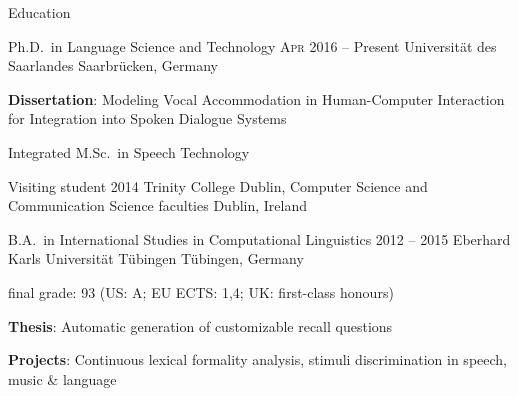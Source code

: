 \documentclass{resume} %
\begin{document}
\begin{rSection}{Education}

\begin{rSubsection}
	{Ph.D.\ in Language Science and Technology}
	{\textsc{Apr} 2016 -- Present}
	{Universität des Saarlandes}
	{Saarbrücken, Germany} %
	
	\setlength{\itemindent}{.7cm}
		
	\item \textbf{Dissertation}: Modeling Vocal Accommodation in Human-Computer Interaction for Integration \hspace*{3.4cm}into Spoken Dialogue Systems %
	\item Integrated M.Sc.\ in Speech Technology
\end{rSubsection}

\begin{rSubsection}
	{Visiting student}
	{2014}
	{Trinity College Dublin, Computer Science and Communication Science faculties}
	{Dublin, Ireland}
	
	\setlength{\itemindent}{.7cm}
	
	\item[]
\end{rSubsection}

\begin{rSubsection}
	{B.A.\ in International Studies in Computational Linguistics}
	{2012 -- 2015}
	{Eberhard Karls Universität Tübingen}
	{Tübingen, Germany}
	
	\vspace*{-.2cm}
	\item[]{final grade: 93 {\footnotesize (US: A; EU ECTS: 1,4; UK: first-class honours)}}
	\vspace*{.2cm}

	\setlength{\itemindent}{.7cm}
	
	\item \textbf{Thesis}: Automatic generation of customizable recall questions
	\item \textbf{Projects}: Continuous lexical formality analysis, stimuli discrimination in speech, music \& language
\end{rSubsection}

\end{rSection}
\end{document}
